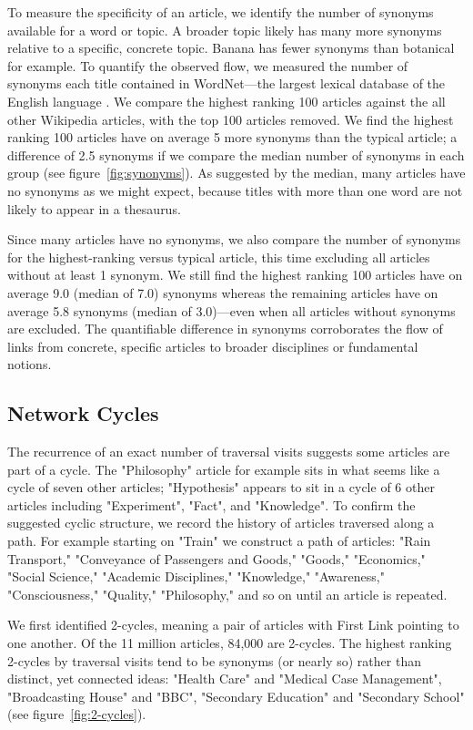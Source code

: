 \documentclass[pre,twocolumn,twoside,superscriptaddress,floatfix, aps, 10pt]{revtex4-1}
\begin{document}
To measure the specificity of an article, we identify the number of synonyms available for a word or topic. 
A  broader topic likely has many more synonyms relative to a specific, concrete topic. 
Banana has fewer synonyms than botanical for example. 
To quantify the observed flow, we measured the number of synonyms each title contained in WordNet---the largest lexical database of the English language 
\cite{wordnet}. 
We compare the highest ranking 100 articles against the all other Wikipedia articles, with the top 100 articles removed.
We find the highest ranking 100 articles have on average 5 more synonyms than the typical article; a difference of 2.5 synonyms if we compare the median number of synonyms in each group
(see figure~\ref{fig:synonyms}). 
As suggested by the median, many articles have no synonyms as we might expect, because titles with more than one word are not likely to appear in a thesaurus. 

Since many articles have no synonyms, we also compare the number of synonyms for the highest-ranking versus typical article, this time excluding all articles without at least 1 synonym. 
We still find the highest ranking 100 articles have on average 9.0 
(median of 7.0) synonyms whereas the remaining articles have 
on average 5.8 synonyms (median of 3.0)---even when all articles without
synonyms are excluded.
The quantifiable difference in synonyms corroborates the flow of links from concrete, specific articles to broader disciplines or fundamental notions.



\subsection{Network Cycles}

The recurrence of an exact number of traversal visits suggests some articles are part of a cycle. 
The "Philosophy" article for example sits in what seems like a cycle of seven other articles; "Hypothesis" appears to sit in a 
cycle of 6 other articles including "Experiment", "Fact", and "Knowledge".
To confirm the suggested cyclic structure, we record the history of articles traversed along a path. For example starting on "Train" we construct a path of articles: 
"Rain Transport,"
"Conveyance of Passengers and Goods," 
"Goods," 
"Economics,"
"Social Science,"
"Academic Disciplines,"
"Knowledge,"
"Awareness,"
"Consciousness,"
"Quality,"
"Philosophy," and so on until an article is repeated.

We first identified 2-cycles, meaning a pair of articles with First Link pointing to one another.
Of the 11 million articles, 84,000 are 2-cycles. 
The highest ranking 2-cycles by traversal visits tend to be synonyms (or nearly so) rather than distinct, yet connected ideas:
"Health Care" and "Medical Case Management", "Broadcasting House" and "BBC", "Secondary Education" and "Secondary School" 
(see figure~\ref{fig:2-cycles}).
\end{document}
